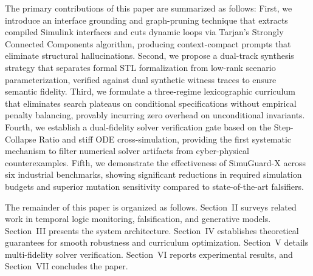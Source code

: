 \documentclass[journal]{IEEEtran}
\begin{document}
The primary contributions of this paper are summarized as follows:
First, we introduce an interface grounding and graph-pruning technique that extracts compiled Simulink interfaces and cuts dynamic loops via Tarjan's Strongly Connected Components algorithm, producing context-compact prompts that eliminate structural hallucinations.
Second, we propose a dual-track synthesis strategy that separates formal STL formalization from low-rank scenario parameterization, verified against dual synthetic witness traces to ensure semantic fidelity.
Third, we formulate a three-regime lexicographic curriculum that eliminates search plateaus on conditional specifications without empirical penalty balancing, provably incurring zero overhead on unconditional invariants.
Fourth, we establish a dual-fidelity solver verification gate based on the Step-Collapse Ratio and stiff ODE cross-simulation, providing the first systematic mechanism to filter numerical solver artifacts from cyber-physical counterexamples.
Fifth, we demonstrate the effectiveness of SimuGuard-X across six industrial benchmarks, showing significant reductions in required simulation budgets and superior mutation sensitivity compared to state-of-the-art falsifiers.

The remainder of this paper is organized as follows. Section~II surveys related work in temporal logic monitoring, falsification, and generative models. Section~III presents the system architecture. Section~IV establishes theoretical guarantees for smooth robustness and curriculum optimization. Section~V details multi-fidelity solver verification. Section~VI reports experimental results, and Section~VII concludes the paper.
\end{document}
